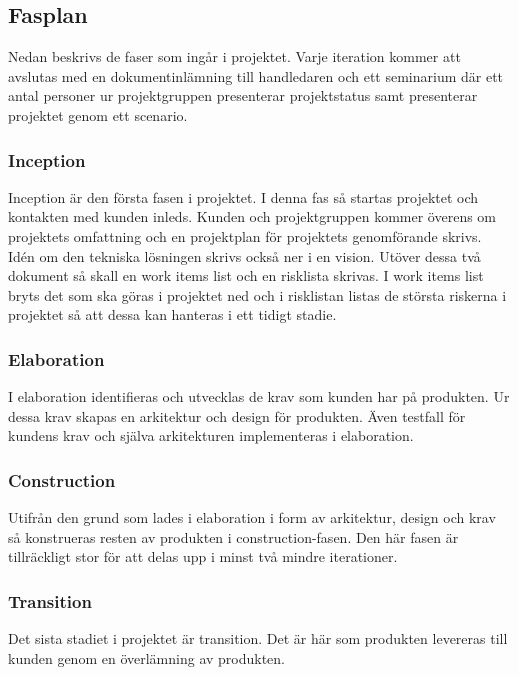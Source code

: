 \subsection{Fasplan}
Nedan beskrivs de faser som ingår i projektet. Varje iteration kommer att avslutas med en dokumentinlämning till handledaren och ett seminarium där ett antal personer ur projektgruppen presenterar projektstatus samt presenterar projektet genom ett scenario.

\subsubsection*{Inception}
Inception är den första fasen i projektet. I denna fas så startas projektet och kontakten med kunden inleds. Kunden och projektgruppen kommer överens om projektets omfattning och en projektplan för projektets genomförande skrivs. Idén om den tekniska lösningen skrivs också ner i en vision. Utöver dessa två dokument så skall en work items list och en risklista skrivas. I work items list bryts det som ska göras i projektet ned och i risklistan listas de största riskerna i projektet så att dessa kan hanteras i ett tidigt stadie.

\subsubsection*{Elaboration}
I elaboration identifieras och utvecklas de krav som kunden har på produkten. Ur dessa krav skapas en arkitektur och design för produkten. Även testfall för kundens krav och själva arkitekturen implementeras i elaboration.

\subsubsection*{Construction}
Utifrån den grund som lades i elaboration i form av arkitektur, design och krav så konstrueras resten av produkten i construction-fasen. Den här fasen är tillräckligt stor för att delas upp i minst två mindre iterationer. %

\subsubsection*{Transition}
Det sista stadiet i projektet är transition. Det är här som produkten levereras till kunden genom en överlämning av produkten.

